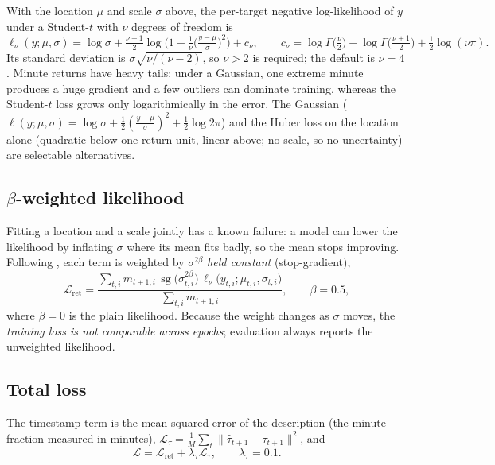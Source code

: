 \documentclass[11pt]{article}
\DeclareMathOperator{\sg}{sg}
\begin{document}
With the location $\mu$ and scale $\sigma$ above, the per-target negative log-likelihood of $y$ under a Student-$t$ with $\nu$ degrees of freedom is
\begin{equation}
  \ell_\nu(y;\mu,\sigma)=\log\sigma+\tfrac{\nu+1}{2}\log\!\Big(1+\tfrac1\nu\big(\tfrac{y-\mu}{\sigma}\big)^2\Big)+c_\nu,\qquad
  c_\nu=\log\Gamma\!\big(\tfrac\nu2\big)-\log\Gamma\!\big(\tfrac{\nu+1}2\big)+\tfrac12\log(\nu\pi).
\end{equation}
Its standard deviation is $\sigma\sqrt{\nu/(\nu-2)}$, so $\nu>2$ is required; the default is $\nu=4$. Minute returns have heavy tails: under a Gaussian, one extreme minute
produces a huge gradient and a few outliers can dominate training, whereas the Student-$t$ loss grows only logarithmically in the error. The Gaussian ($\ell(y;\mu,\sigma)=\log\sigma+\tfrac12(\tfrac{y-\mu}{\sigma})^2+\tfrac12\log 2\pi$) and the
Huber loss \citep{huber1964robust} on the location alone (quadratic below one return unit, linear above; no scale, so no uncertainty) are selectable alternatives.

\subsection{\texorpdfstring{$\beta$}{Beta}-weighted likelihood}

Fitting a location and a scale jointly has a known failure: a model can lower the likelihood by inflating $\sigma$ where its mean fits badly, so the mean stops improving. Following
\citet{seitzer2022pitfalls}, each term is weighted by $\sigma^{2\beta}$ \emph{held constant} (stop-gradient),
\begin{equation}
  \mathcal L_{\text{ret}}=\frac{\sum_{t,i}m_{t+1,i}\,\sg\!\big(\sigma_{t,i}^{2\beta}\big)\,\ell_\nu\!\big(y_{t,i};\mu_{t,i},\sigma_{t,i}\big)}{\sum_{t,i}m_{t+1,i}},\qquad\beta=0.5,
\end{equation}
where $\beta=0$ is the plain likelihood. Because the weight changes as $\sigma$ moves, the \emph{training loss is not comparable across epochs}; evaluation always reports the unweighted likelihood.

\subsection{Total loss}

The timestamp term is the mean squared error of the description (the minute fraction measured in minutes),
$\mathcal L_\tau=\tfrac1M\sum_t\|\hat\tau_{t+1}-\tau_{t+1}\|^2$, and
\begin{equation}
  \mathcal L=\mathcal L_{\text{ret}}+\lambda_\tau\mathcal L_\tau,\qquad\lambda_\tau=0.1.
\end{equation}
\end{document}
